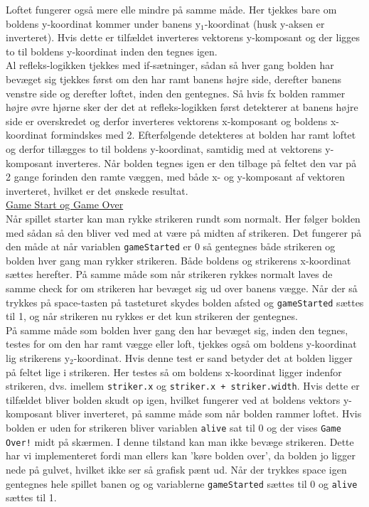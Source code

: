 Loftet fungerer også mere elle mindre på samme måde. Her tjekkes bare om boldens y-koordinat kommer under banens y$_{1}$-koordinat (husk y-aksen er inverteret). Hvis dette er tilfældet inverteres vektorens y-komposant og der ligges to til boldens y-koordinat inden den tegnes igen. \\

Al refleks-logikken tjekkes med if-sætninger, sådan så hver gang bolden har bevæget sig tjekkes først om den har ramt banens højre side, derefter banens venstre side og derefter loftet, inden den gentegnes. Så hvis fx bolden rammer højre øvre hjørne sker der det at refleks-logikken først detekterer at banens højre side er overskredet og derfor inverteres vektorens x-komposant og boldens x-koordinat formindskes med 2. Efterfølgende detekteres at bolden har ramt loftet og derfor tillægges to til boldens y-koordinat, samtidig med at vektorens y-komposant inverteres. Når bolden tegnes igen er den tilbage på feltet den var på 2 gange forinden den ramte væggen, med både x- og y-komposant af vektoren inverteret, hvilket er det ønskede resultat.\\

\underline{Game Start og Game Over}\\

Når spillet starter kan man rykke strikeren rundt som normalt. Her følger bolden med sådan så den bliver ved med at være på midten af strikeren. Det fungerer på den måde at når variablen \texttt{gameStarted} er 0 så gentegnes både strikeren og bolden hver gang man rykker strikeren. Både boldens og strikerens x-koordinat sættes herefter. På samme måde som når strikeren rykkes normalt laves de samme check for om strikeren har bevæget sig ud over banens vægge. Når der så trykkes på space-tasten på tasteturet skydes bolden afsted og \texttt{gameStarted} sættes til 1, og når strikeren nu rykkes er det kun strikeren der gentegnes.\\

På samme måde som bolden hver gang den har bevæget sig, inden den tegnes, testes for om den har ramt vægge eller loft, tjekkes også om boldens y-koordinat lig strikerens y$_{2}$-koordinat. Hvis denne test er sand betyder det at bolden ligger på feltet lige i strikeren. Her testes så om boldens x-koordinat ligger indenfor strikeren, dvs. imellem \texttt{striker.x} og \texttt{striker.x + striker.width}. Hvis dette er tilfældet bliver bolden skudt op igen, hvilket fungerer ved at boldens vektors y-komposant bliver inverteret, på samme måde som når bolden rammer loftet. Hvis bolden er uden for strikeren bliver variablen \texttt{alive} sat til 0 og der vises \texttt{Game Over!} midt på skærmen. I denne tilstand kan man ikke bevæge strikeren. Dette har vi implementeret fordi man ellers kan 'køre bolden over', da bolden jo ligger nede på gulvet, hvilket ikke ser så grafisk pænt ud. Når der trykkes space igen gentegnes hele spillet banen og og variablerne \texttt{gameStarted} sættes til 0 og \texttt{alive} sættes til 1. \\

